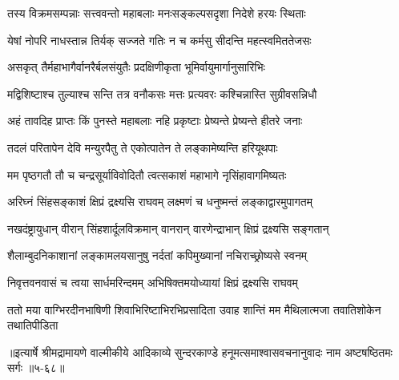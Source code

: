 \twolineshloka
{तस्य विक्रमसम्पन्नाः सत्त्ववन्तो महाबलाः}
{मनःसङ्कल्पसदृशा निदेशे हरयः स्थिताः} %

\twolineshloka
{येषां नोपरि नाधस्तान्न तिर्यक् सज्जते गतिः}
{न च कर्मसु सीदन्ति महत्स्वमिततेजसः} %

\twolineshloka
{असकृत् तैर्महाभागैर्वानरैर्बलसंयुतैः}
{प्रदक्षिणीकृता भूमिर्वायुमार्गानुसारिभिः} %

\twolineshloka
{मद्विशिष्टाश्च तुल्याश्च सन्ति तत्र वनौकसः}
{मत्तः प्रत्यवरः कश्चिन्नास्ति सुग्रीवसन्निधौ} %

\twolineshloka
{अहं तावदिह प्राप्तः किं पुनस्ते महाबलाः}
{नहि प्रकृष्टाः प्रेष्यन्ते प्रेष्यन्ते हीतरे जनाः} %

\twolineshloka
{तदलं परितापेन देवि मन्युरपैतु ते}
{एकोत्पातेन ते लङ्कामेष्यन्ति हरियूथपाः} %

\twolineshloka
{मम पृष्ठगतौ तौ च चन्द्रसूर्याविवोदितौ}
{त्वत्सकाशं महाभागे नृसिंहावागमिष्यतः} %

\twolineshloka
{अरिघ्नं सिंहसङ्काशं क्षिप्रं द्रक्ष्यसि राघवम्}
{लक्ष्मणं च धनुष्मन्तं लङ्काद्वारमुपागतम्} %

\twolineshloka
{नखदंष्ट्रायुधान् वीरान् सिंहशार्दूलविक्रमान्}
{वानरान् वारणेन्द्राभान् क्षिप्रं द्रक्ष्यसि सङ्गतान्} %

\twolineshloka
{शैलाम्बुदनिकाशानां लङ्कामलयसानुषु}
{नर्दतां कपिमुख्यानां नचिराच्छ्रोष्यसे स्वनम्} %

\twolineshloka
{निवृत्तवनवासं च त्वया सार्धमरिन्दमम्}
{अभिषिक्तमयोध्यायां क्षिप्रं द्रक्ष्यसि राघवम्} %

\twolineshloka
{ततो मया वाग्भिरदीनभाषिणी शिवाभिरिष्टाभिरभिप्रसादिता}
{उवाह शान्तिं मम मैथिलात्मजा तवातिशोकेन तथातिपीडिता} %


॥इत्यार्षे श्रीमद्रामायणे वाल्मीकीये आदिकाव्ये सुन्दरकाण्डे हनूमत्समाश्वासवचनानुवादः नाम अष्टषष्ठितमः सर्गः ॥५-६८॥
